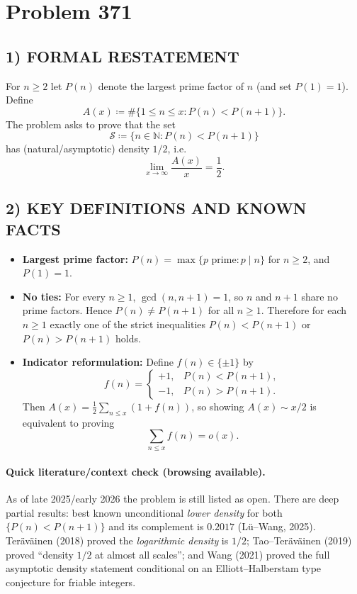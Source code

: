 \section*{Problem 371}

\subsection*{1) FORMAL RESTATEMENT}
For $n\ge 2$ let $P(n)$ denote the largest prime factor of $n$ (and set $P(1)=1$).
Define
\[
A(x) \coloneqq \#\bigl\{1\le n\le x : P(n)<P(n+1)\bigr\}.
\]
The problem asks to prove that the set
\[
\mathcal{S}\coloneqq \{n\in\mathbb{N} : P(n)<P(n+1)\}
\]
has (natural/asymptotic) density $1/2$, i.e.
\[
\lim_{x\to\infty}\frac{A(x)}{x}=\frac12.
\]

\subsection*{2) KEY DEFINITIONS AND KNOWN FACTS}
\begin{itemize}[leftmargin=2em]
\item \textbf{Largest prime factor:} $P(n)=\max\{p\text{ prime}: p\mid n\}$ for $n\ge2$, and $P(1)=1$.
\item \textbf{No ties:} For every $n\ge1$, $\gcd(n,n+1)=1$, so $n$ and $n+1$ share no prime factors. Hence $P(n)\neq P(n+1)$ for all $n\ge1$. Therefore for each $n\ge1$ exactly one of the strict inequalities $P(n)<P(n+1)$ or $P(n)>P(n+1)$ holds.
\item \textbf{Indicator reformulation:} Define $f(n)\in\{\pm1\}$ by
\[
 f(n)=\begin{cases}
 +1,&P(n)<P(n+1),\\
 -1,&P(n)>P(n+1).
 \end{cases}
\]
Then $A(x)=\tfrac12\sum_{n\le x}(1+f(n))$, so showing $A(x)\sim x/2$ is equivalent to proving
\[
 \sum_{n\le x} f(n) = o(x).
\]
\end{itemize}

\paragraph{Quick literature/context check (browsing available).}
As of late 2025/early 2026 the problem is still listed as open. There are deep partial results: best known unconditional \emph{lower density} for both $\{P(n)<P(n+1)\}$ and its complement is $0.2017$ (L\"u--Wang, 2025). Ter\"av\"ainen (2018) proved the \emph{logarithmic density} is $1/2$; Tao--Ter\"av\"ainen (2019) proved ``density $1/2$ at almost all scales''; and Wang (2021) proved the full asymptotic density statement conditional on an Elliott--Halberstam type conjecture for friable integers.

